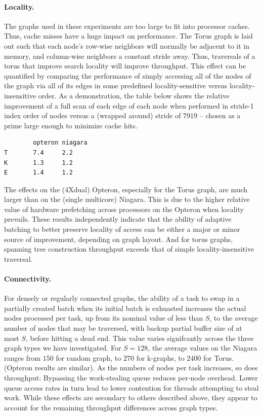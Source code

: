 \paragraph{Locality.} The graphs used in these experiments are too large to fit
into processor caches. Thus, cache misses have a huge impact on
performance. The Torus graph is laid out such that each node's
row-wise neighbors will normally be adjacent to it in memory, and
column-wise neighbors a constant stride away. Thus, traversals of a
torus that improve search locality will improve throughput.  This
effect can be quantified by comparing the performance of simply
accessing all of the nodes of the graph via all of its edges in some
predefined locality-sensitive versus locality-insensitive order.  As a
demonstration, the table below shows the relative
improvement of a full scan of each edge of each node when performed in
stride-1 index order of nodes versus a (wrapped around) stride of
$7919$ -- chosen as a prime large enough to minimize cache hits.  

{\footnotesize
\begin{verbatim}
        opteron niagara
T       7.4     2.2
K       1.3     1.2
E       1.4     1.2
\end{verbatim}}

The
effects on the (4Xdual) Opteron, especially for the Torus graph, are
much larger than on the (single multicore) Niagara. This is due to the
higher relative value of hardware prefetching across processors on the
Opteron when locality prevails.  These results independently indicate
that the ability of adaptive batching to better preserve locality of
access can be either a major or minor source of improvement, depending
on graph layout.  And for torus graphs, spanning tree construction
throughput exceeds that of simple locality-insensitive traversal.

\paragraph{Connectivity.}  For densely or regularly connected graphs, the
ability of a task to swap in a partially created batch when its
initial batch is exhuasted increases the actual nodes processed per
task, up from its nominal value of less than $S$, to the average number
of nodes that may be traversed, with backup partial buffer size of at
most $S$, before hitting a dead end. This value varies signifcantly
across the three graph types we have investigated. For $S=128$, the
average values on the Niagara ranges from $150$ for random graph, to $270$
for k-graphs, to $2400$ for Torus. (Opteron results are similar). As the
numbers of nodes per task increases, so does throughput: Bypassing the
work-stealing queue reduces per-node overhead.  Lower queue access
rates in turn lead to lower contention for threads attempting to steal
work. While these effects are secondary to others described above,
they appear to account for the remaining throughput differences across
graph types.


